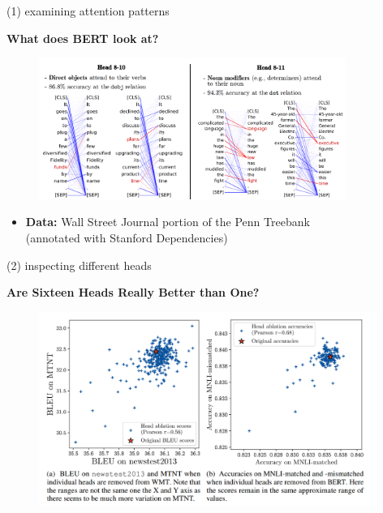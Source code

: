 
\begin{frame}{(1) examining attention patterns}

\vfill

\textbf{What does BERT look at?} 

	\begin{figure}
		\centering
		\includegraphics[width = 10cm]{figure/51-linguistic.png}
	\end{figure}
	
	\begin{itemize}
		\item \textbf{Data:} Wall Street Journal portion of the Penn Treebank\\
					(annotated with Stanford Dependencies)
	\end{itemize}
	
\vfill

\end{frame}


\begin{frame}{(2) inspecting different heads}

\vfill

\textbf{Are Sixteen Heads Really Better than One?} 

	\begin{figure}
		\centering
		\includegraphics[width = 11cm]{figure/51-remove-heads.png}
	\end{figure}
	
\vfill

\end{frame}

